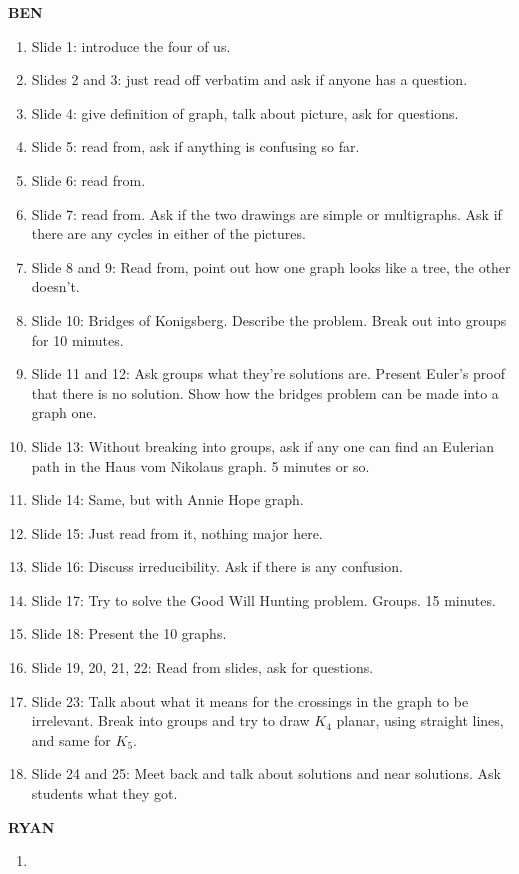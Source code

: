 \documentclass[12pt]{article}
\begin{document}
    \textbf{BEN}
    \begin{enumerate}
        \item Slide 1: introduce the four of us.
        \item Slides 2 and 3: just read off verbatim and ask if
            anyone has a question.
        \item Slide 4: give definition of graph, talk about picture, ask for questions.
        \item Slide 5: read from, ask if anything is confusing so far.
        \item Slide 6: read from.
        \item Slide 7: read from. Ask if the two drawings are simple or multigraphs.
            Ask if there are any cycles in either of the pictures.
        \item Slide 8 and 9: Read from, point out how one graph looks like a tree, the other doesn't.
        \item Slide 10: Bridges of Konigsberg. Describe the problem. Break out into groups for 10 minutes.
        \item Slide 11 and 12: Ask groups what they're solutions are. Present Euler's proof that there is no
            solution. Show how the bridges problem can be made into a graph one.
        \item Slide 13: Without breaking into groups, ask if any one can find an Eulerian path in the
            Haus vom Nikolaus graph. 5 minutes or so.
        \item Slide 14: Same, but with Annie Hope graph.
        \item Slide 15: Just read from it, nothing major here.
        \item Slide 16: Discuss irreducibility. Ask if there is any confusion.
        \item Slide 17: Try to solve the Good Will Hunting problem. Groups. 15 minutes.
        \item Slide 18: Present the 10 graphs.
        \item Slide 19, 20, 21, 22: Read from slides, ask for questions.
        \item Slide 23: Talk about what it means for the crossings in the graph to be irrelevant.
            Break into groups and try to draw $K_{4}$ planar, using straight lines, and same for $K_{5}$.
        \item Slide 24 and 25: Meet back and talk about solutions and near solutions. Ask students what they got.
    \end{enumerate}
    \textbf{RYAN}
    \begin{enumerate}
        \item 
    \end{enumerate}
    
\end{document}
